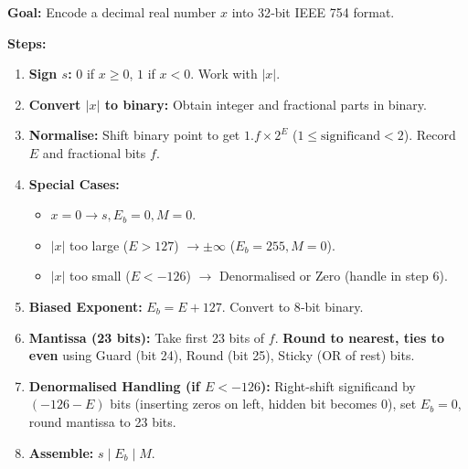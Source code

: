 \documentclass[11pt]{article}
\begin{document}
\begin{methode}
\textbf{Goal:} Encode a decimal real number $x$ into 32‑bit IEEE 754 format.\par
\textbf{Steps:}
\begin{enumerate}
    \item \textbf{Sign $s$:} $0$ if $x \ge 0$, $1$ if $x < 0$. Work with $|x|$.
    \item \textbf{Convert $|x|$ to binary:} Obtain integer and fractional parts in binary.
    \item \textbf{Normalise:} Shift binary point to get $1.f \times 2^E$ ($1 \le \text{significand} < 2$). Record $E$ and fractional bits $f$.
    \item \textbf{Special Cases:}
          \begin{itemize}
              \item $x = 0 \to s, E_b=0, M=0$.
              \item $|x|$ too large ($E > 127$) $\to \pm\infty$ ($E_b=255, M=0$).
              \item $|x|$ too small ($E < -126$) $\to$ Denormalised or Zero (handle in step 6).
          \end{itemize}
    \item \textbf{Biased Exponent:} $E_b = E + 127$. Convert to 8‑bit binary.
    \item \textbf{Mantissa (23 bits):} Take first 23 bits of $f$. \textbf{Round to nearest, ties to even} using Guard (bit 24), Round (bit 25), Sticky (OR of rest) bits.
    \item \textbf{Denormalised Handling (if $E < -126$):} Right-shift significand by $(-126 - E)$ bits (inserting zeros on left, hidden bit becomes 0), set $E_b = 0$, round mantissa to 23 bits.
    \item \textbf{Assemble:} $s\;|\;E_b\;|\;M$.
\end{enumerate}
\end{methode}
\end{document}
